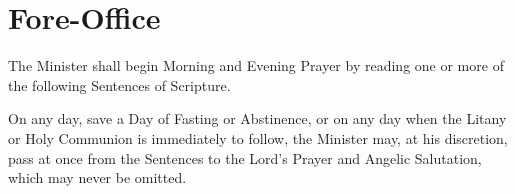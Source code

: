 \section{Fore-Office}
\begin{secrubric}
    The Minister shall begin Morning and Evening Prayer by reading one or more of the following Sentences of Scripture.
\end{secrubric}
\begin{secrubric}
    On any day, save a Day of Fasting or Abstinence, or on any day when the Litany or Holy Communion is immediately to follow, the Minister may, at his discretion, pass at once from the Sentences to the Lord's Prayer and Angelic Salutation, which may never be omitted.
\end{secrubric}

